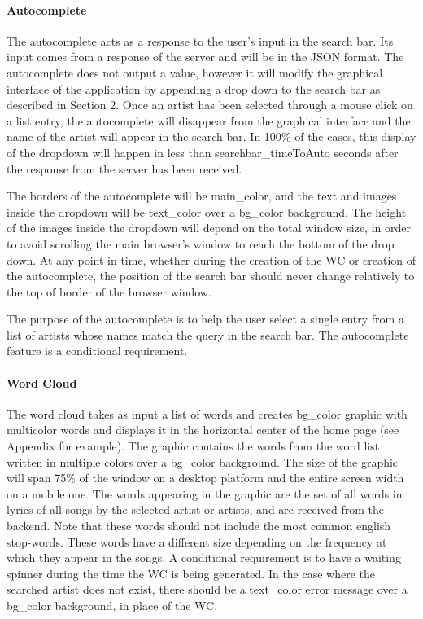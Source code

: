 \documentclass[]{article}
\begin{document}
\paragraph{Autocomplete}\label{autocomplete}

The autocomplete acts as a response to the user's input in the search
bar. Its input comes from a response of the server and will be in the
JSON format. The autocomplete does not output a value, however it will
modify the graphical interface of the application by appending a drop
down to the search bar as described in Section 2. Once an artist has
been selected through a mouse click on a list entry, the autocomplete
will disappear from the graphical interface and the name of the artist
will appear in the search bar. In 100\% of the cases, this display of
the dropdown will happen in less than searchbar\_timeToAuto seconds
after the response from the server has been received.

The borders of the autocomplete will be main\_color, and the text and
images inside the dropdown will be text\_color over a bg\_color
background. The height of the images inside the dropdown will depend on
the total window size, in order to avoid scrolling the main browser's
window to reach the bottom of the drop down. At any point in time,
whether during the creation of the WC or creation of the autocomplete,
the position of the search bar should never change relatively to the top
of border of the browser window.

The purpose of the autocomplete is to help the user select a single
entry from a list of artists whose names match the query in the search
bar. The autocomplete feature is a conditional requirement.

\paragraph{Word Cloud}\label{word-cloud}

The word cloud takes as input a list of words and creates bg\_color
graphic with multicolor words and displays it in the horizontal center
of the home page (see Appendix for example). The graphic contains the
words from the word list written in multiple colors over a bg\_color
background. The size of the graphic will span 75\% of the window on a
desktop platform and the entire screen width on a mobile one. The words
appearing in the graphic are the set of all words in lyrics of all songs
by the selected artist or artists, and are received from the backend.
Note that these words should not include the most common english
stop-words. These words have a different size depending on the frequency
at which they appear in the songs. A conditional requirement is to have
a waiting spinner during the time the WC is being generated. In the case
where the searched artist does not exist, there should be a text\_color
error message over a bg\_color background, in place of the WC.
\end{document}
